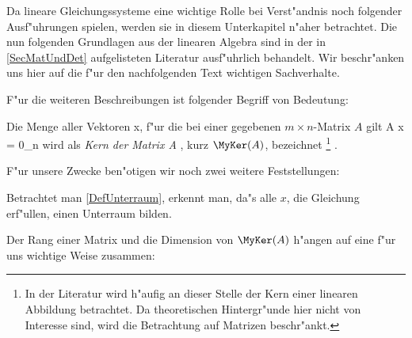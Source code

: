 
\label{SecLinEqu}

Da lineare Gleichungssysteme eine wichtige Rolle bei Verst"andnis
noch folgender Ausf"uhrungen spielen, werden sie in diesem Unterkapitel
n"aher betrachtet. Die nun folgenden Grundlagen aus der linearen 
Algebra sind in der in \ref{SecMatUndDet} aufgelisteten Literatur
ausf"uhrlich behandelt. Wir beschr"anken uns hier auf die f"ur
den nachfolgenden Text wichtigen Sachverhalte.

F"ur die weiteren Beschreibungen ist folgender Begriff von 
Bedeutung:

\MyBeginDef
\label{DefKern}
    Die Menge aller Vektoren x,
    f"ur die bei einer gegebenen $m \times n$-Matrix $A$ gilt
        A x = 0_n
    \Eeq
    wird als {\em Kern der Matrix A} , kurz $\MyKer(A)$,
    bezeichnet \footnote{ In der Literatur wird h"aufig an dieser
    Stelle der Kern einer linearen Abbildung betrachtet. Da theoretischen
    Hintergr"unde hier nicht von Interesse sind, wird die Betrachtung auf
    Matrizen beschr"ankt.} .
\MyEndDef

F"ur unsere Zwecke ben"otigen wir noch zwei weitere Feststellungen:

\begin{bemerkung}
\label{SatzKernUnterraum}
    Betrachtet man \ref{DefUnterraum}, erkennt man,
    da"s alle $x$, die Gleichung  erf"ullen,
    einen Unterraum bilden.
\end{bemerkung}

Der Rang einer Matrix und die Dimension von $\MyKer(A)$ h"angen auf
eine f"ur uns wichtige Weise zusammen:

